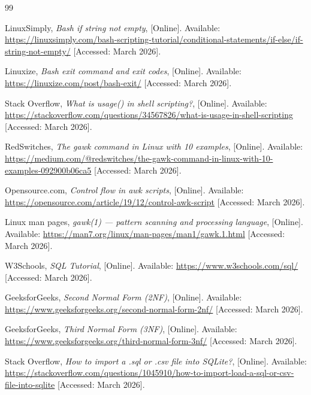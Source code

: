 \documentclass[12pt, a4paper]{report}
\begin{document}
\begin{thebibliography}{99}


LinuxSimply, \textit{Bash if string not empty}, [Online]. Available: \url{https://linuxsimply.com/bash-scripting-tutorial/conditional-statements/if-else/if-string-not-empty/} [Accessed: March 2026].

Linuxize, \textit{Bash exit command and exit codes}, [Online]. Available: \url{https://linuxize.com/post/bash-exit/} [Accessed: March 2026].

Stack Overflow, \textit{What is usage() in shell scripting?}, [Online]. Available: \url{https://stackoverflow.com/questions/34567826/what-is-usage-in-shell-scripting} [Accessed: March 2026].

RedSwitches, \textit{The gawk command in Linux with 10 examples}, [Online]. Available: \url{https://medium.com/@redswitches/the-gawk-command-in-linux-with-10-examples-092900b06ca5} [Accessed: March 2026].

Opensource.com, \textit{Control flow in awk scripts}, [Online]. Available: \url{https://opensource.com/article/19/12/control-awk-script} [Accessed: March 2026].

Linux man pages, \textit{gawk(1) --- pattern scanning and processing language}, [Online]. Available: \url{https://man7.org/linux/man-pages/man1/gawk.1.html} [Accessed: March 2026].


W3Schools, \textit{SQL Tutorial}, [Online]. Available: \url{https://www.w3schools.com/sql/} [Accessed: March 2026].

GeeksforGeeks, \textit{Second Normal Form (2NF)}, [Online]. Available: \url{https://www.geeksforgeeks.org/second-normal-form-2nf/} [Accessed: March 2026].

GeeksforGeeks, \textit{Third Normal Form (3NF)}, [Online]. Available: \url{https://www.geeksforgeeks.org/third-normal-form-3nf/} [Accessed: March 2026].


Stack Overflow, \textit{How to import a .sql or .csv file into SQLite?}, [Online]. Available: \url{https://stackoverflow.com/questions/1045910/how-to-import-load-a-sql-or-csv-file-into-sqlite} [Accessed: March 2026].


\end{thebibliography}
\end{document}
